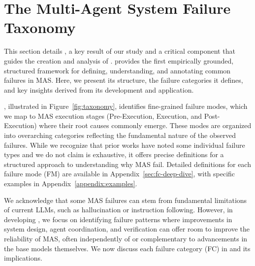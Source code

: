 \section{The Multi-Agent System Failure Taxonomy}
\label{sec:mast}

This section details \taxonomy{}, a key result of our study and a critical component that guides the creation and analysis of \dataset{}. \taxonomy{} provides the first empirically grounded, structured framework for defining, understanding, and annotating common failures in MAS. Here, we present its structure, the failure categories it defines, and key insights derived from its development and application.



\taxonomy{}, illustrated in Figure~\ref{fig:taxonomy}, identifies \numFailureMode{} fine-grained failure modes, which we map to MAS execution stages (Pre-Execution, Execution, and Post-Execution) where their root causes commonly emerge. These modes are organized into \numFailureArea{} overarching categories reflecting the fundamental nature of the observed failures. While we recognize that prior works have noted some individual failure types and we do not claim \taxonomy{} is exhaustive, it offers precise definitions for a structured approach to understanding why MAS fail. Detailed definitions for each failure mode (FM) are available in Appendix~\ref{sec:fc-deep-dive}, with specific examples in Appendix~\ref{appendix:examples}.

We acknowledge that some MAS failures can stem from fundamental limitations of current LLMs, such as hallucination or instruction following. However, in developing \taxonomy{}, we focus on identifying failure patterns where improvements in system design, agent coordination, and verification can offer room to improve the reliability of MAS, often independently of or complementary to advancements in the base models themselves. We now discuss each failure category (FC) in \taxonomy{} and its implications.

